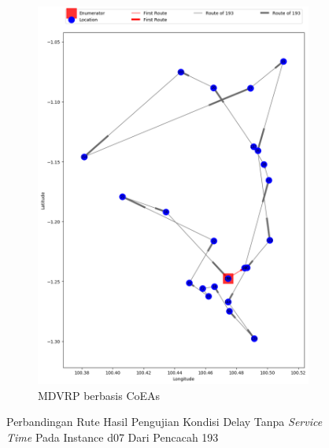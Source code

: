 \begin{figure}[H]
	\centering
	\begin{subfigure}[t]{\textwidth}
		\centering
		\includegraphics[width=\textwidth]{Resources/Images/delayed_7/real_m15_n100_delayed_7_193_coes}
		\caption{MDVRP berbasis CoEAs}
		\label{fig:real_m15_n100_delayed_7_193_coes}
	\end{subfigure}
	\caption{Perbandingan Rute Hasil Pengujian Kondisi Delay Tanpa \textit{Service Time} Pada Instance d07 Dari Pencacah 193}
	\label{fig:real_m15_n100_delayed_7_193}
\end{figure}



